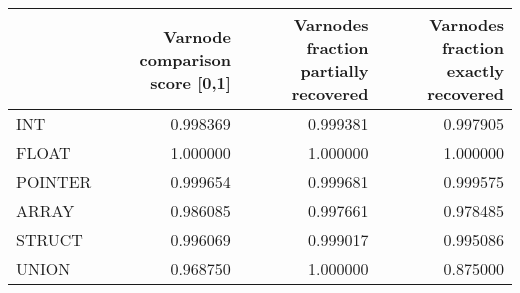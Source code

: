 \begin{tabular}{lrrr}
\toprule
{} &  Varnode comparison score [0,1] &  Varnodes fraction partially recovered &  Varnodes fraction exactly recovered \\
\midrule
INT     &                        0.998369 &                               0.999381 &                             0.997905 \\
FLOAT   &                        1.000000 &                               1.000000 &                             1.000000 \\
POINTER &                        0.999654 &                               0.999681 &                             0.999575 \\
ARRAY   &                        0.986085 &                               0.997661 &                             0.978485 \\
STRUCT  &                        0.996069 &                               0.999017 &                             0.995086 \\
UNION   &                        0.968750 &                               1.000000 &                             0.875000 \\
\bottomrule
\end{tabular}
